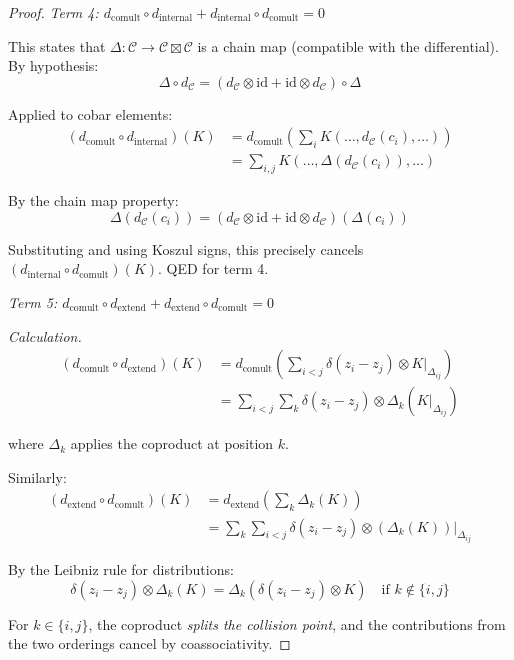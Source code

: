 \begin{proof}
\emph{Term 4: $d_{\text{comult}} \circ d_{\text{internal}} + d_{\text{internal}} 
\circ d_{\text{comult}} = 0$}

This states that $\Delta: \mathcal{C} \to \mathcal{C} \boxtimes \mathcal{C}$ is a 
chain map (compatible with the differential). By hypothesis:
\[\Delta \circ d_{\mathcal{C}} = (d_{\mathcal{C}} \otimes \text{id} + \text{id} 
\otimes d_{\mathcal{C}}) \circ \Delta\]

Applied to cobar elements:
\begin{align*}
(d_{\text{comult}} \circ d_{\text{internal}})(K) &= d_{\text{comult}}\left(\sum_i 
K(\ldots, d_{\mathcal{C}}(c_i), \ldots)\right) \\
&= \sum_{i,j} K(\ldots, \Delta(d_{\mathcal{C}}(c_i)), \ldots)
\end{align*}

By the chain map property:
\[\Delta(d_{\mathcal{C}}(c_i)) = (d_{\mathcal{C}} \otimes \text{id} + \text{id} 
\otimes d_{\mathcal{C}})(\Delta(c_i))\]

Substituting and using Koszul signs, this precisely cancels $(d_{\text{internal}} 
\circ d_{\text{comult}})(K)$. QED for term 4.

\emph{Term 5: $d_{\text{comult}} \circ d_{\text{extend}} + d_{\text{extend}} 
\circ d_{\text{comult}} = 0$}

\emph{Calculation.}
\begin{align*}
(d_{\text{comult}} \circ d_{\text{extend}})(K) &= d_{\text{comult}}\left(\sum_{i<j} 
\delta(z_i - z_j) \otimes K|_{\Delta_{ij}}\right) \\
&= \sum_{i<j} \sum_k \delta(z_i - z_j) \otimes \Delta_k(K|_{\Delta_{ij}})
\end{align*}

where $\Delta_k$ applies the coproduct at position $k$.

Similarly:
\begin{align*}
(d_{\text{extend}} \circ d_{\text{comult}})(K) &= d_{\text{extend}}\left(\sum_k 
\Delta_k(K)\right) \\
&= \sum_k \sum_{i<j} \delta(z_i - z_j) \otimes (\Delta_k(K))|_{\Delta_{ij}}
\end{align*}

By the Leibniz rule for distributions:
\[\delta(z_i - z_j) \otimes \Delta_k(K) = \Delta_k(\delta(z_i - z_j) \otimes K) 
\quad \text{if } k \notin \{i, j\}\]

For $k \in \{i,j\}$, the coproduct \emph{splits the collision point}, and the 
contributions from the two orderings cancel by coassociativity.


\end{proof}
